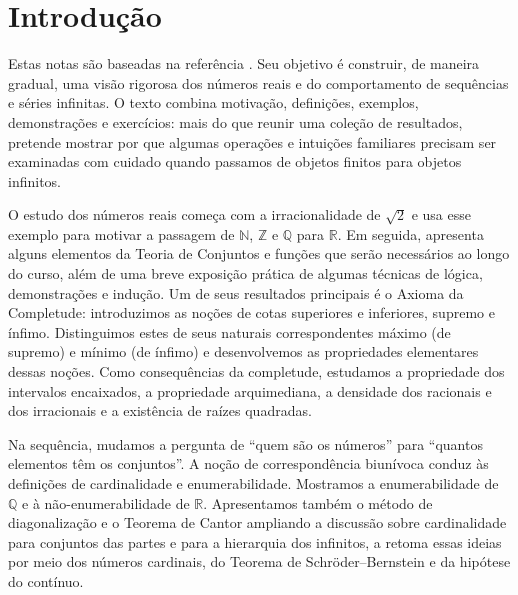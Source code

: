 

\section{Introdução}

Estas notas são baseadas na referência \cite{MR3331079}. Seu objetivo é
construir, de maneira gradual, uma visão rigorosa dos números reais e do
comportamento de sequências e séries infinitas. O texto combina motivação,
definições, exemplos, demonstrações e exercícios: mais do que reunir uma
coleção de resultados, pretende mostrar por que algumas operações e
intuições familiares precisam ser examinadas com cuidado quando passamos de
objetos finitos para objetos infinitos.

O estudo dos números reais começa com a irracionalidade de
$\sqrt{2}$ e usa esse exemplo para motivar a passagem de $\mathbb{N}$, $\mathbb{Z}$
e $\mathbb{Q}$ para $\mathbb{R}$. Em seguida, apresenta alguns elementos da
Teoria de Conjuntos e funções que serão necessários ao longo do curso, além de uma
breve exposição prática de algumas técnicas de lógica, demonstrações e indução. 
Um de seus resultados principais é o Axioma da Completude: 
introduzimos as noções de cotas superiores e inferiores, supremo e
ínfimo. Distinguimos estes de seus naturais correspondentes 
máximo (de supremo) e mínimo (de ínfimo) e desenvolvemos as propriedades
elementares dessas noções. Como consequências da completude, estudamos a
propriedade dos intervalos encaixados, a propriedade arquimediana, a densidade
dos racionais e dos irracionais e a existência de raízes quadradas.

Na sequência, mudamos a pergunta de ``quem são os números''
para ``quantos elementos têm os conjuntos''. A noção de correspondência
biunívoca conduz às definições de cardinalidade e enumerabilidade. Mostramos a
enumerabilidade de $\mathbb{Q}$ e à não-enumerabilidade de $\mathbb{R}$. Apresentamos também
o método de diagonalização e o Teorema de Cantor ampliando a discussão sobre cardinalidade 
para conjuntos das partes e para a hierarquia dos infinitos, a  retoma
essas ideias por meio dos números cardinais, do Teorema de
Schröder--Bernstein e da hipótese do contínuo.

